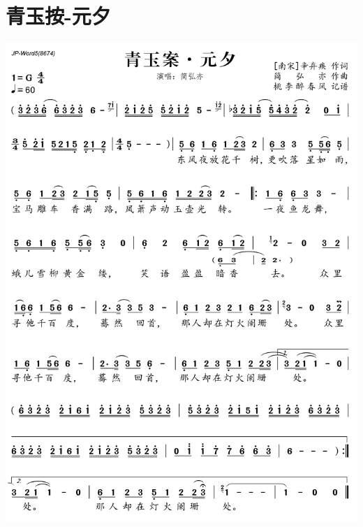 \documentclass[cn,pad,chinese,chinesefont=nofont]{elegantbook}
\begin{document}
\section{青玉按-元夕}
    \includegraphics[width=\textwidth]{dongxiao/202003231431青玉按.png}
\end{document}
